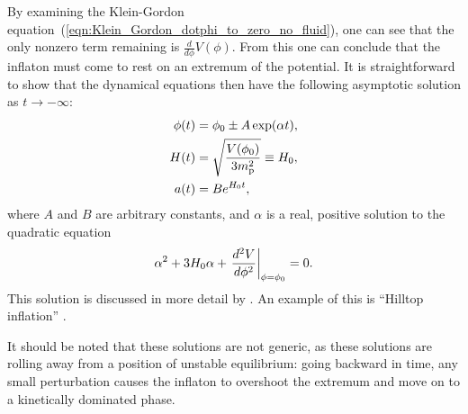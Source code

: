 By examining the Klein-Gordon equation~(\ref{eqn:Klein_Gordon_dotphi_to_zero_no_fluid}), one can see that the only nonzero term remaining is $\frac{d}{d\phi}V(\phi)$. From this one can conclude that the inflaton must come to rest on an extremum of the potential. It is straightforward to show that the dynamical equations then have the following asymptotic solution as $t \to -\infty$:
%
\begin{align}
  \phi(t)
  &=
  \phi_0 \pm A \exp(\alpha t),\\
  H(t)
  &=
  \sqrt{\frac{V(\phi_0)}{3m_{\mathrm{p}}^2}} \equiv H_0,\\
  a(t)
  &=
  B e^{H_0t},
\end{align}
%
where $A$ and $B$  are arbitrary constants, and $\alpha$ is a real, positive solution to the quadratic equation
% 
%
\begin{equation}
  \alpha^2 + 3H_0\alpha + \left.
  \frac{{d^2}V}{{d}\phi^2}\right|_{\phi=\phi_0}=0.
\end{equation}
%
This solution is discussed in more detail by \citet{destri_preinflationary_2010}. An example of this is ``Hilltop inflation'' \citep{linde_1982,albrecht_1982}. 

It should be noted that these solutions are not generic, as these solutions are rolling away from a position of unstable equilibrium: going backward in time, any small perturbation causes the inflaton to overshoot the extremum and move on to a kinetically dominated phase.

